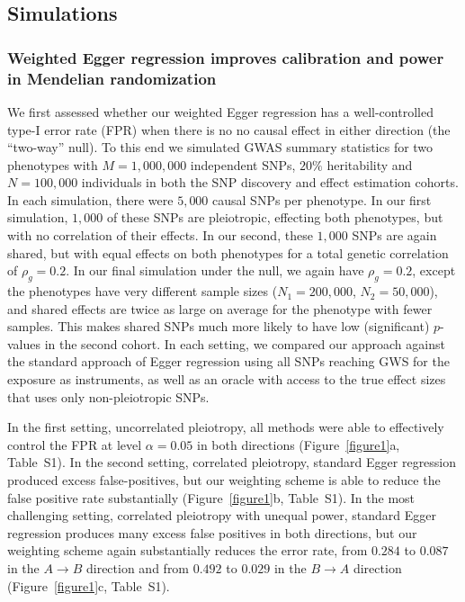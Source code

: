 \documentclass{article}
\begin{document}
\subsection*{Simulations}
\subsubsection*{Weighted Egger regression improves calibration and power in Mendelian randomization}
We first assessed whether our weighted Egger regression
has a well-controlled type-I error rate (FPR) when there is no no causal effect in either direction (the ``two-way'' null). To this
end we simulated GWAS summary statistics for two phenotypes with $M=1,000,000$
independent SNPs, $20\%$ heritability and $N = 100,000$ individuals in both
 the SNP discovery and effect estimation cohorts. In each simulation, there
 were $5,000$ causal
SNPs per phenotype. In our first simulation, $1,000$ of these SNPs are pleiotropic,
effecting both phenotypes, but with no correlation of their effects. In our
second, these $1,000$ SNPs are again shared, but with equal effects on both phenotypes
for a total genetic correlation of $\rho_g = 0.2$. In our final simulation under the
null, we again have $\rho_g = 0.2$, except the phenotypes have very different sample sizes
($N_1 = 200,000$, $N_2 = 50,000$), and shared effects are twice as large on average
for the phenotype with fewer samples. This makes shared SNPs much more likely to have
low (significant) $p$-values in the second cohort. In each setting, we compared our approach
against the standard approach of Egger regression using all SNPs reaching GWS for
 the exposure as instruments, as well as an oracle with access to the true
effect sizes that uses only non-pleiotropic SNPs.

In the first setting, uncorrelated pleiotropy, all methods were able to 
effectively control the FPR at level $\alpha = 0.05$ in both directions
(Figure~\ref{figure1}a, Table~S1).
In the second setting, correlated pleiotropy,
standard Egger regression produced excess false-positives, but our weighting
scheme is able to reduce the false positive rate substantially
(Figure~\ref{figure1}b, Table~S1).  In the most challenging setting,
correlated pleiotropy with unequal power, standard Egger regression produces
many excess false positives in both directions, but our weighting scheme
again substantially reduces the error rate, from $0.284$ to $0.087$ in
the $A\rightarrow B$ direction and from $0.492$ to $0.029$ in the 
$B\rightarrow A$ direction (Figure~\ref{figure1}c, Table~S1).
\end{document}
